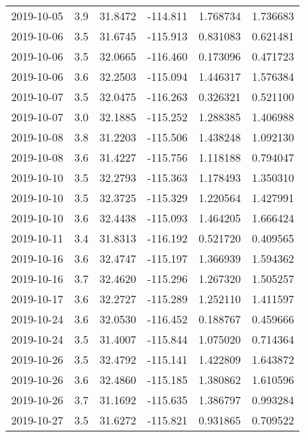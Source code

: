 \begin{tabular}{lrrrrr}
2019-10-05 &       3.9 &  31.8472 &  -114.811 &         1.768734 &         1.736683 \\
2019-10-06 &       3.5 &  31.6745 &  -115.913 &         0.831083 &         0.621481 \\
2019-10-06 &       3.5 &  32.0665 &  -116.460 &         0.173096 &         0.471723 \\
2019-10-06 &       3.6 &  32.2503 &  -115.094 &         1.446317 &         1.576384 \\
2019-10-07 &       3.5 &  32.0475 &  -116.263 &         0.326321 &         0.521100 \\
2019-10-07 &       3.0 &  32.1885 &  -115.252 &         1.288385 &         1.406988 \\
2019-10-08 &       3.8 &  31.2203 &  -115.506 &         1.438248 &         1.092130 \\
2019-10-08 &       3.6 &  31.4227 &  -115.756 &         1.118188 &         0.794047 \\
2019-10-10 &       3.5 &  32.2793 &  -115.363 &         1.178493 &         1.350310 \\
2019-10-10 &       3.5 &  32.3725 &  -115.329 &         1.220564 &         1.427991 \\
2019-10-10 &       3.6 &  32.4438 &  -115.093 &         1.464205 &         1.666424 \\
2019-10-11 &       3.4 &  31.8313 &  -116.192 &         0.521720 &         0.409565 \\
2019-10-16 &       3.6 &  32.4747 &  -115.197 &         1.366939 &         1.594362 \\
2019-10-16 &       3.7 &  32.4620 &  -115.296 &         1.267320 &         1.505257 \\
2019-10-17 &       3.6 &  32.2727 &  -115.289 &         1.252110 &         1.411597 \\
2019-10-24 &       3.6 &  32.0530 &  -116.452 &         0.188767 &         0.459666 \\
2019-10-24 &       3.5 &  31.4007 &  -115.844 &         1.075020 &         0.714364 \\
2019-10-26 &       3.5 &  32.4792 &  -115.141 &         1.422809 &         1.643872 \\
2019-10-26 &       3.6 &  32.4860 &  -115.185 &         1.380862 &         1.610596 \\
2019-10-26 &       3.7 &  31.1692 &  -115.635 &         1.386797 &         0.993284 \\
2019-10-27 &       3.5 &  31.6272 &  -115.821 &         0.931865 &         0.709522 \\

\end{tabular}
